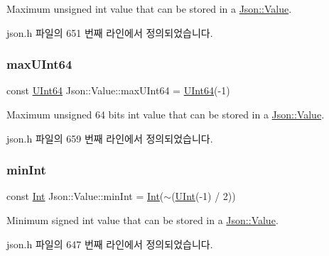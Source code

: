 Maximum unsigned int value that can be stored in a \hyperlink{class_json_1_1_value}{Json\+::\+Value}. 



json.\+h 파일의 651 번째 라인에서 정의되었습니다.

\mbox{\label{class_json_1_1_value_ae1eb89c305c39516696ff305cffa01da}} 
\subsubsection{\texorpdfstring{max\+U\+Int64}{maxUInt64}}
{\footnotesize\ttfamily const \hyperlink{class_json_1_1_value_a8b62564be8c087c6d18de180ff4e13e3}{U\+Int64} Json\+::\+Value\+::max\+U\+Int64 = \hyperlink{class_json_1_1_value_a8b62564be8c087c6d18de180ff4e13e3}{U\+Int64}(-\/1)\hspace{0.3cm}{\ttfamily [static]}}



Maximum unsigned 64 bits int value that can be stored in a \hyperlink{class_json_1_1_value}{Json\+::\+Value}. 



json.\+h 파일의 659 번째 라인에서 정의되었습니다.

\mbox{\label{class_json_1_1_value_a7df8a39e2502b8c92a6a41e3d752d2c8}} 
\subsubsection{\texorpdfstring{min\+Int}{minInt}}
{\footnotesize\ttfamily const \hyperlink{class_json_1_1_value_abdf7a7ff73eb130ffcab28504ffdb405}{Int} Json\+::\+Value\+::min\+Int = \hyperlink{class_json_1_1_value_abdf7a7ff73eb130ffcab28504ffdb405}{Int}($\sim$(\hyperlink{class_json_1_1_value_a0933d59b45793ae4aade1757c322a98d}{U\+Int}(-\/1) / 2))\hspace{0.3cm}{\ttfamily [static]}}



Minimum signed int value that can be stored in a \hyperlink{class_json_1_1_value}{Json\+::\+Value}. 



json.\+h 파일의 647 번째 라인에서 정의되었습니다.

